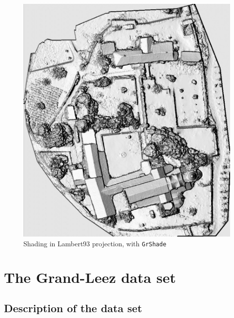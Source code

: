 \begin{figure}
\begin{center}
\includegraphics[width=160mm]{FIGS/Cuxa/L93-Shade.jpg}
\caption{Shading in Lambert93 projection, with {\tt GrShade}}
\end{center}
\end{figure}

\section{The Grand-Leez data set}

\subsection{Description of the data set}\label{Grand-Leez:DataSet}

